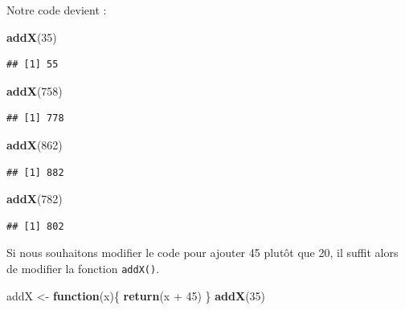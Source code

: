 \documentclass[twoside,symmetric]{book}
\newenvironment{Shaded}{}{}
\newcommand{\ControlFlowTok}[1]{\textbf{#1}}
\newcommand{\DecValTok}[1]{#1}
\newcommand{\KeywordTok}[1]{\textbf{#1}}
\newcommand{\NormalTok}[1]{#1}
\newcommand{\OperatorTok}[1]{#1}
\newcommand{\StringTok}[1]{#1}
\begin{document}
Notre code devient :

\begin{Shaded}
\begin{Highlighting}[]
\KeywordTok{addX}\NormalTok{(}\DecValTok{35}\NormalTok{)}
\end{Highlighting}
\end{Shaded}

\begin{verbatim}
## [1] 55
\end{verbatim}

\begin{Shaded}
\begin{Highlighting}[]
\KeywordTok{addX}\NormalTok{(}\DecValTok{758}\NormalTok{)}
\end{Highlighting}
\end{Shaded}

\begin{verbatim}
## [1] 778
\end{verbatim}

\begin{Shaded}
\begin{Highlighting}[]
\KeywordTok{addX}\NormalTok{(}\DecValTok{862}\NormalTok{)}
\end{Highlighting}
\end{Shaded}

\begin{verbatim}
## [1] 882
\end{verbatim}

\begin{Shaded}
\begin{Highlighting}[]
\KeywordTok{addX}\NormalTok{(}\DecValTok{782}\NormalTok{)}
\end{Highlighting}
\end{Shaded}

\begin{verbatim}
## [1] 802
\end{verbatim}

Si nous souhaitons modifier le code pour ajouter 45 plutôt que 20, il suffit alors de modifier la fonction \texttt{addX()}.

\begin{Shaded}
\begin{Highlighting}[]
\NormalTok{addX <-}\StringTok{ }\ControlFlowTok{function}\NormalTok{(x)\{}
  \KeywordTok{return}\NormalTok{(x }\OperatorTok{+}\StringTok{ }\DecValTok{45}\NormalTok{)}
\NormalTok{\}}
\KeywordTok{addX}\NormalTok{(}\DecValTok{35}\NormalTok{)}
\end{Highlighting}
\end{Shaded}
\end{document}
